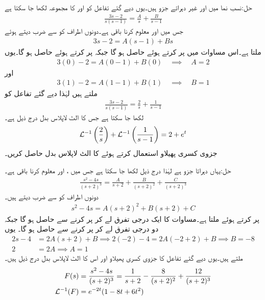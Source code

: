 حل:نسب نما میں  اور  غیر دہراتے جزو ہیں۔یوں دیے گئے تفاعل کو  اور  کا مجموعہ لکھا جا سکتا ہے
\begin{align*}
\frac{3s-2}{s(s-1)}=\frac{A}{s}+\frac{B}{s-1}
\end{align*}
جس میں  اور  معلوم کرنا باقی ہے۔دونوں اطراف کو  سے ضرب دیتے ہوئے
\begin{align*}
3s-2=A(s-1)+Bs
\end{align*}
ملتا ہے۔اس مساوات میں  پر کرتے ہوئے  حاصل ہو گا جبکہ  پر کرتے ہوئے  حاصل ہو گا۔یوں
\begin{align*}
3(0)-2=A(0-1)+B(0)\quad \implies \quad A=2
\end{align*} 
اور
\begin{align*}
3(1)-2=A(1-1)+B(1)\quad \implies \quad B=1
\end{align*}
ملتے ہیں لہٰذا دیے گئے تفاعل کو
\begin{align*}
\frac{3s-2}{s(s-1)}=\frac{2}{s}+\frac{1}{s-1}
\end{align*}
لکھا جا سکتا ہے جس کا الٹ لاپلاس بدل درج ذیل ہے۔
\begin{align*}
\mathcal{L}^{-1}\left(\frac{2}{s}\right)+\mathcal{L}^{-1}\left(\frac{1}{s-1}\right)=2+e^t
\end{align*}
جزوی کسری پھیلاو استعمال کرتے ہوئے  کا الٹ لاپلاس بدل حاصل کریں۔

حل:یہاں  دہراتا جزو ہے لہٰذا درج ذیل لکھا جا سکتا ہے جس میں ،  اور  معلوم کرنا باقی ہے۔
\begin{align*}
\frac{s^2-4s}{(s+2)^3}=\frac{A}{s+2}+\frac{B}{(s+2)^2}+\frac{C}{(s+2)^3}
\end{align*}
دونوں اطراف کو  سے ضرب دیتے ہیں۔
\begin{align*}
s^2-4s=A(s+2)^2+B(s+2)+C
\end{align*}
 پر کرتے ہوئے  ملتا ہے۔مساوات کا ایک درجی تفرق لے کر  پر کرنے سے  حاصل ہو گا جبکہ دو درجی تفرق لے کر  پر کرنے سے  حاصل ہو گا۔ یوں
\begin{align*}
2s-4&=2A(s+2)+B \implies  2(-2)-4=2A(-2+2)+B \implies  B=-8\\
2&=2A\implies  A=1
\end{align*}
ملتے ہیں۔یوں دیے گئے تفاعل کا جزوی کسری پھیلاو  اور اس کا الٹ لاپلاس بدل درج ذیل ہیں۔
\begin{align*}
F(s)&=\frac{s^2-4s}{(s+2)^3}=\frac{1}{s+2}-\frac{8}{(s+2)^2}+\frac{12}{(s+2)^3}\\
\mathcal{L}^{-1}(F)&=e^{-2t}(1-8t+6t^2)
\end{align*}

